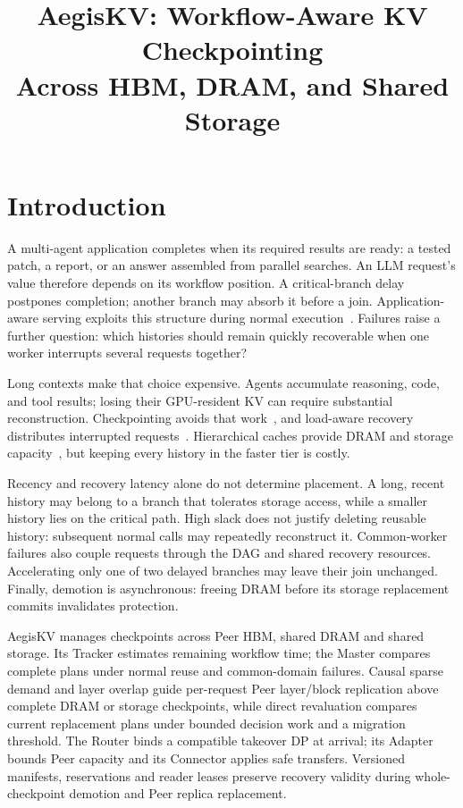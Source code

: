 \documentclass[sigplan,10pt,anonymous,nonacm]{acmart}
\title{AegisKV: Workflow-Aware KV Checkpointing\texorpdfstring{\\}{ }Across HBM, DRAM, and Shared Storage}
\begin{document}
\pagestyle{aegispreview}

\maketitle
\thispagestyle{aegispreview}
\raggedbottom

\section{Introduction}
\label{sec:introduction}

A multi-agent application completes when its required results are ready:
a tested patch, a report, or an answer assembled from parallel searches.
An LLM request's value therefore depends on its workflow position. A
critical-branch delay postpones completion; another branch may absorb it
before a join. Application-aware serving exploits this structure during
normal execution~\cite{lin2024parrot,pan2025kvflow,ni2026topas}. Failures
raise a further question: which histories should remain quickly
recoverable when one worker interrupts several requests together?

Long contexts make that choice expensive. Agents accumulate reasoning,
code, and tool results; losing their GPU-resident KV can require substantial
reconstruction. Checkpointing avoids that work~\cite{strati2024dejavu,jayakody2026ghostserve},
and load-aware recovery distributes interrupted requests~\cite{cao2026lumen}.
Hierarchical caches provide DRAM and storage capacity~\cite{qin2025mooncake,xie2026strata},
but keeping every history in the faster tier is costly.

Recency and recovery latency alone do not determine placement. A long,
recent history may belong to a branch that tolerates storage access,
while a smaller history lies on the critical path. High slack does not
justify deleting reusable history: subsequent normal calls may repeatedly
reconstruct it. Common-worker failures also couple requests through the
DAG and shared recovery resources. Accelerating only one of two delayed
branches may leave their join unchanged. Finally, demotion is asynchronous:
freeing DRAM before its storage replacement commits invalidates protection.

AegisKV manages checkpoints across Peer HBM, shared DRAM and shared storage.
Its Tracker estimates remaining workflow time; the Master compares
complete plans under normal reuse and common-domain failures. Causal
sparse demand and layer overlap guide per-request Peer layer/block
replication above complete DRAM or storage checkpoints, while direct
revaluation compares current replacement plans under bounded decision
work and a migration threshold. The Router binds a compatible takeover
DP at arrival; its Adapter bounds Peer capacity and its Connector applies
safe transfers. Versioned manifests, reservations and reader leases
preserve recovery validity during whole-checkpoint demotion and Peer
replica replacement.
\end{document}

